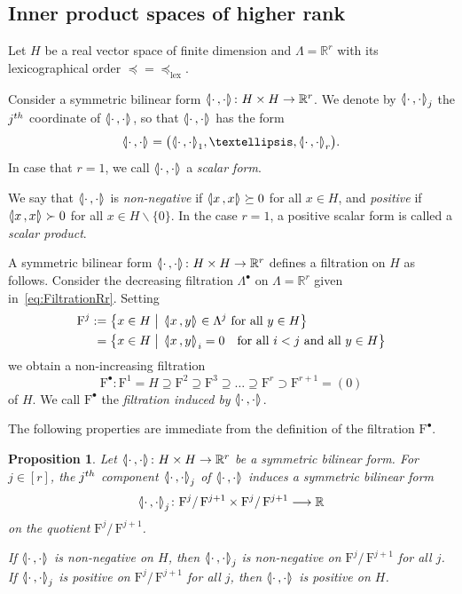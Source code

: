 \documentclass[10pt,a4paper]{amsart}
\newcommand{\llangle}{\mathopen{\langle\mkern -3.1mu\lvert}}
\newcommand{\rrangle}{\mathclose{\rvert\mkern -3.1mu\rangle}}
\newcommand{\highinn}[2]{{\llangle#2\rrangle_{#1}}}
\newcommand{\rquot}[2]{#1/\,#2}
\newcommand{\filter}{\mathrm{F}}
\newcommand{\R}{\mathbb{R}}
\renewcommand{\setminus}{\smallsetminus}
\newcommand{\lexeq}{\preceq_{\mathrm{lex}}}
\renewcommand*{\to}{\mathchoice{\longrightarrow}{\rightarrow}{\rightarrow}{\rightarrow}}
\newcommand*{\Mk}{\mkern -2mu}
\newcommand*{\MK}{\mkern 2mu}
\newtheorem{prop}[cdrthm]{Proposition}
\theoremstyle{definition}\newtheorem{defi}[cdrthm]{Definition}
\begin{document}
\subsection{Inner product spaces of higher rank}

Let $H$ be a real vector space of finite dimension and $\Lambda =\R^r$ with its lexicographical order $\preceq=\lexeq$.

Consider a symmetric bilinear form $\highinn{}{\cdot \,, \cdot} \colon H \times H \to \R^r$. We denote by $\highinn{j}{\cdot\,, \cdot}$ the $j^{\rm th}$ coordinate of $\highinn{}{\cdot\,,\cdot}$, so that $\highinn{}{\cdot\,,\cdot}$ has the form
\[
\highinn{}{\cdot\,,\cdot} = \bigl(\highinn{1}{\cdot\,, \cdot}, \dots, \highinn{r}{\cdot\,, \cdot}\bigr).
\]
In case that $r=1$, we call $\highinn{}{\cdot \,, \cdot}$ a \emph{scalar form}.

We say that $\highinn{}{\cdot \,, \cdot}$ is \emph{non-negative} if $\highinn{}{x\,, x} \succeq 0$ for all $x \in H$, and \emph{positive} if $\highinn{}{x\,, x} \succ 0$ for all $x \in H \setminus \{0\}$. In the case $r=1$, a positive scalar form is called a \emph{scalar product}.

A symmetric bilinear form $\highinn{}{\cdot \,, \cdot} \colon H \times H \to \R^r$ defines a filtration on $H$ as follows. Consider the decreasing filtration $\Lambda^\bullet$ on $\Lambda = \R^r$ given in~\eqref{eq:FiltrationRr}. Setting
\begin{align}
\filter^j \,\MK &\!\Mk:= \bigl\{ x \in H \bigm| \,\highinn{}{x \,, y} \in \Lambda^j \text{ for all }y \in H\bigr\}\\
&= \bigl\{ x \in H \bigm| \,\highinn{}{x \,, y}_i = 0 \quad\text{for all }i <j\text{  and all }y \in H\bigr\}
\end{align}
we obtain a non-increasing filtration
\[
\filter^\bullet\colon \filter^1 = H \supseteq \filter^2 \supseteq \filter^3 \supseteq \dots \supseteq \filter^r \supset \filter^{r+1} = (0)
\]
of $H$. We call $\filter^\bullet$ the \emph{filtration induced by} $\highinn{}{\cdot \,, \cdot}$.

\setcounter{cdrthm}{3}
The following properties are immediate from the definition of the filtration $\filter^\bullet$.

\begin{prop}\label{prop:GradedForms}
Let $\highinn{}{\cdot \,, \cdot} \colon H \times H \to \R^r$ be a symmetric bilinear form. For $j \in [r]$, the $j^{\rm th}$ component $\highinn{j}{\cdot \,, \cdot}$ of $\highinn{}{\cdot \,, \cdot}$ induces a symmetric bilinear form
\[
\highinn{j}{\cdot\,, \cdot} \colon \rquot{\filter^j}{\filter^{j+1}} \times \rquot{\filter^j}{\filter^{j+1}} \to \R
\]
on the quotient $\rquot{\filter^j}{\filter^{j+1}}$.

If $\highinn{}{\cdot \,, \cdot}$ is non-negative on $H$, then $\highinn{j}{\cdot \,, \cdot}$ is non-negative on $\rquot{\filter^j}{\filter^{j+1}}$ for all $j$. If $\highinn{j}{\cdot \,, \cdot}$ is positive on $\rquot{\filter^j}{\filter^{j+1}}$ for all $j$, then $\highinn{}{\cdot \,, \cdot}$ is positive on $H$.
\end{prop}
\end{document}
